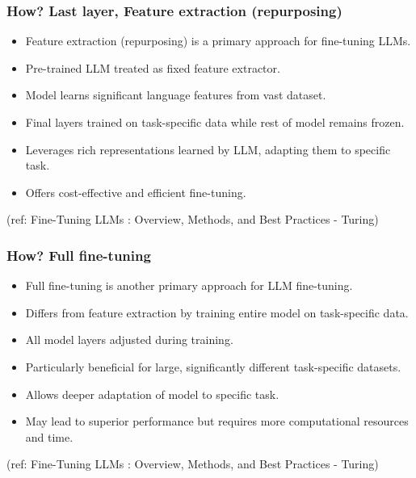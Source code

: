 \begin{frame}[fragile]\frametitle{How? Last layer, Feature extraction (repurposing)}

  \begin{itemize}
    \item Feature extraction (repurposing) is a primary approach for fine-tuning LLMs.
    \item Pre-trained LLM treated as fixed feature extractor.
    \item Model learns significant language features from vast dataset.
    \item Final layers trained on task-specific data while rest of model remains frozen.
    \item Leverages rich representations learned by LLM, adapting them to specific task.
    \item Offers cost-effective and efficient fine-tuning.
  \end{itemize}
  
  {\tiny (ref: Fine-Tuning LLMs : Overview, Methods, and Best Practices - Turing)}
  
\end{frame}

\begin{frame}[fragile]\frametitle{How? Full fine-tuning}

  \begin{itemize}
    \item Full fine-tuning is another primary approach for LLM fine-tuning.
    \item Differs from feature extraction by training entire model on task-specific data.
    \item All model layers adjusted during training.
    \item Particularly beneficial for large, significantly different task-specific datasets.
    \item Allows deeper adaptation of model to specific task.
    \item May lead to superior performance but requires more computational resources and time.
  \end{itemize}
  
  {\tiny (ref: Fine-Tuning LLMs : Overview, Methods, and Best Practices - Turing)}
  
\end{frame}

